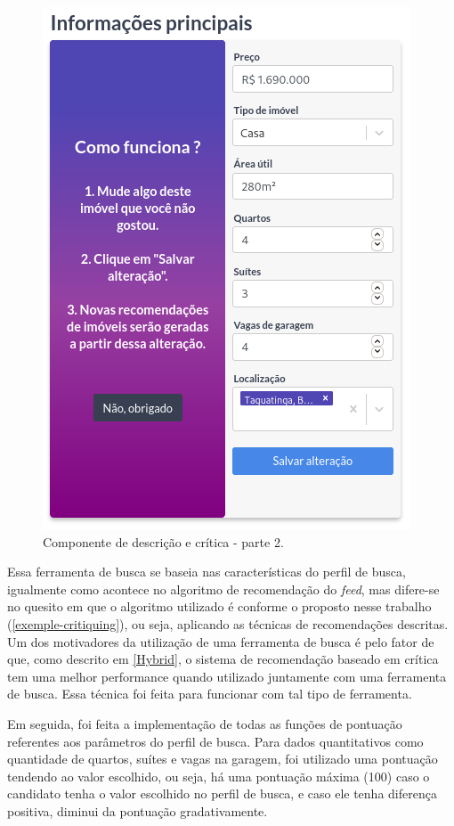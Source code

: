 \begin{figure}[H]
    \centering
    \includegraphics[scale=0.45]{figuras/desenvolvimento/componente_critica2.png}
    \caption[Componente de descrição e crítica - parte 2]{Componente de descrição e crítica - parte 2.}
    \label{fig:componente_critica2}
\end{figure}

Essa ferramenta de busca se baseia nas características do perfil de busca, igualmente como acontece no algoritmo de recomendação do \textit{feed}, mas difere-se no quesito em que o algoritmo utilizado é conforme o proposto nesse trabalho (\ref{exemple-critiquing}), ou seja, aplicando as técnicas de recomendações descritas. Um dos motivadores da utilização de uma ferramenta de busca é pelo fator de que, como descrito em \ref{Hybrid}, o sistema de recomendação baseado em crítica tem uma melhor performance quando utilizado juntamente com uma ferramenta de busca. Essa técnica foi feita para funcionar com tal tipo de ferramenta.

Em seguida, foi feita a implementação de todas as funções de pontuação referentes aos parâmetros do perfil de busca. Para dados quantitativos como quantidade de quartos, suítes e vagas na garagem, foi utilizado uma pontuação tendendo ao valor escolhido, ou seja, há uma pontuação máxima (100) caso o candidato tenha o valor escolhido no perfil de busca, e caso ele tenha diferença positiva, diminui da pontuação gradativamente.

